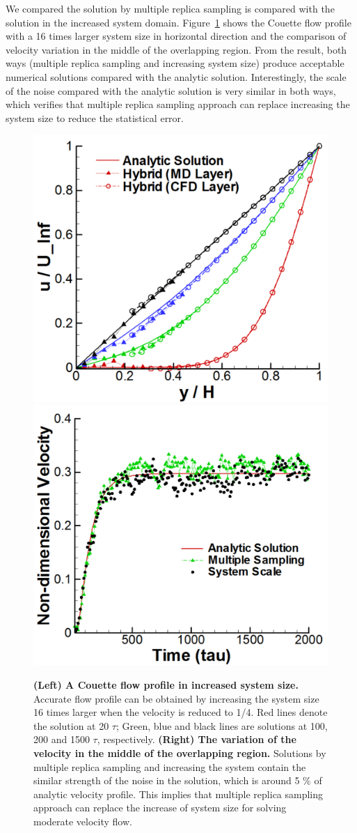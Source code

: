 \documentclass[preprint,12pt]{elsarticle}
\begin{document}
We compared the solution by multiple replica sampling is compared with the solution in the increased system domain. Figure~\ref{increase_system} shows the Couette flow profile with a 16 times larger system size in horizontal direction and the comparison of velocity variation in the middle of the overlapping region. From the result, both ways (multiple replica sampling and increasing system size) produce acceptable numerical solutions compared with the analytic solution. Interestingly, the scale of the noise compared with the analytic solution is very similar in both ways, which verifies that multiple replica sampling approach can replace  increasing the system size to reduce the statistical error.

\begin{figure}
\centering
\includegraphics[width=0.6\linewidth]{Couette_025_Scale16.pdf}
\hskip 1cm
\includegraphics[width=0.6\linewidth]{Couette_025_Temporal_Multiset_VS_Scaleup.pdf}
\vskip-0.2cm
\caption{\small {\bf (Left) A Couette flow profile in increased system size.} 
Accurate flow profile can be obtained by increasing the system size 
16 times larger when the velocity is reduced to 1/4. Red lines denote 
the solution at 20 $\tau$; Green, blue and black lines are solutions 
at 100, 200 and 1500 $\tau$, respectively. 
{\bf (Right) The variation of the velocity in the middle of 
the overlapping region.} Solutions by multiple replica sampling 
and increasing the system contain the similar strength of the noise 
in the solution, which is around 5 $\%$ of analytic velocity profile. 
This implies that multiple replica sampling approach can replace 
the increase of system size for solving moderate velocity flow.}
\label{increase_system}
\end{figure}
\end{document}
